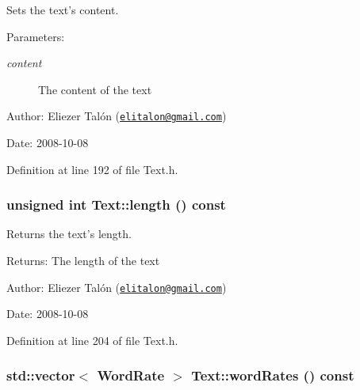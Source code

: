 Sets the text's content. 

\begin{Desc}
\item[Parameters:]
\begin{description}
\item[{\em content}]The content of the text\end{description}
\end{Desc}
\begin{Desc}
\item[Author:]Eliezer Talón (\href{mailto:elitalon@gmail.com}{\tt elitalon@gmail.com}) \end{Desc}
\begin{Desc}
\item[Date:]2008-10-08 \end{Desc}


Definition at line 192 of file Text.h.\hypertarget{class_text_8d76db538f8617fb8880ba3e4ff3e6a5}{
\subsubsection[length]{\setlength{\rightskip}{0pt plus 5cm}unsigned int Text::length () const}}
\label{class_text_8d76db538f8617fb8880ba3e4ff3e6a5}


Returns the text's length. 

\begin{Desc}
\item[Returns:]The length of the text\end{Desc}
\begin{Desc}
\item[Author:]Eliezer Talón (\href{mailto:elitalon@gmail.com}{\tt elitalon@gmail.com}) \end{Desc}
\begin{Desc}
\item[Date:]2008-10-08 \end{Desc}


Definition at line 204 of file Text.h.\hypertarget{class_text_1387d9767b65f80355f1bdede26a0f7b}{
\subsubsection[wordRates]{\setlength{\rightskip}{0pt plus 5cm}std::vector$<$ {\bf WordRate} $>$ Text::wordRates () const}}
\label{class_text_1387d9767b65f80355f1bdede26a0f7b}


